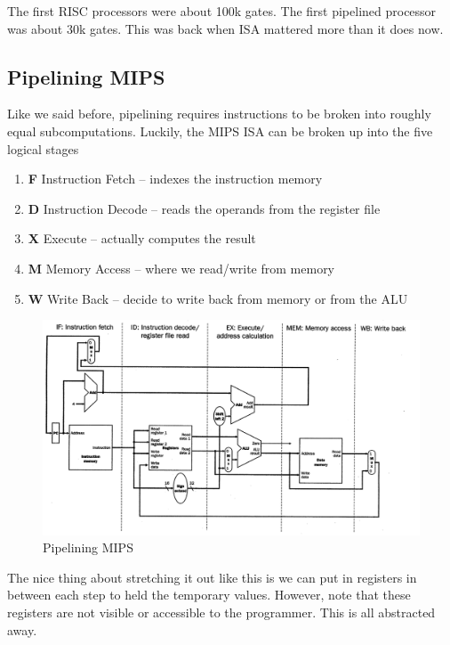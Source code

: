 \documentclass{article}
\begin{document}
The first RISC processors were about 100k gates. The first pipelined processor was about 30k gates. This was back when ISA mattered more than it does now.

\subsection{Pipelining MIPS}

Like we said before, pipelining requires instructions to be broken into roughly equal subcomputations. Luckily, the MIPS ISA can be broken up into the five logical stages 

\begin{enumerate}

\item \textbf{F} Instruction Fetch -- indexes the instruction memory
\item \textbf{D} Instruction Decode -- reads the operands from the register file
\item \textbf{X} Execute -- actually computes the result
\item \textbf{M} Memory Access -- where we read/write from memory
\item \textbf{W} Write Back -- decide to write back from memory or from the ALU

\end{enumerate}

\begin{figure}[ht!]
\centering
\includegraphics[width=120mm]{img/PipeliningMIPS.png}
\caption{Pipelining MIPS}
\end{figure}

The nice thing about stretching it out like this is we can put in registers in between each step to held the temporary values. However, note that these registers are not visible or accessible to the programmer. This is all abstracted away. 
\end{document}
